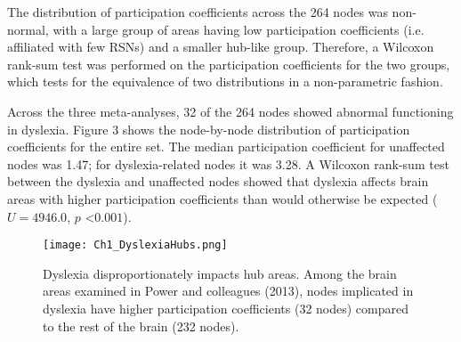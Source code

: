 The distribution of participation coefficients across the 264 nodes was non-normal, with a large group of areas having low participation coefficients (i.e. affiliated with few RSNs) and a smaller hub-like group. Therefore, a Wilcoxon rank-sum test was performed on the participation coefficients for the two groups, which tests for the equivalence of two distributions in a non-parametric fashion.

Across the three meta-analyses, 32 of the 264 nodes showed abnormal functioning in dyslexia. Figure 3 shows the node-by-node distribution of participation coefficients for the entire set. The median participation coefficient for unaffected nodes was 1.47; for dyslexia-related nodes it was 3.28. A Wilcoxon rank-sum test between the dyslexia and unaffected nodes showed that dyslexia affects brain areas with higher participation coefficients than would otherwise be expected ($U = 4946.0$, $p$ \textless $0.001$). 

\begin{figure}[h!]
\centering
\texttt{[image: Ch1\_DyslexiaHubs.png]}
    \caption[Dyslexia disproportionately impacts hub areas.]{Dyslexia disproportionately impacts hub areas. Among the brain areas examined in Power and colleagues (2013), nodes implicated in dyslexia have higher participation coefficients (32 nodes) compared to the rest of the brain (232 nodes).}
\label{fig:texlogo}
\end{figure}


